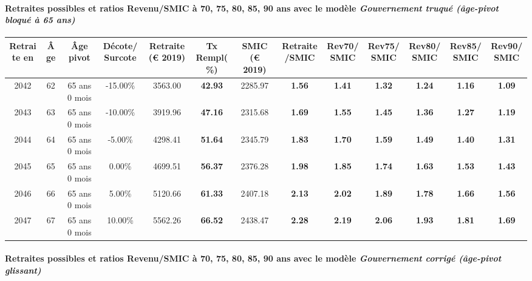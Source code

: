 \paragraph{Retraites possibles et ratios Revenu/SMIC à 70, 75, 80, 85, 90 ans avec le modèle \emph{Gouvernement truqué (âge-pivot bloqué à 65 ans)}}  
 
{ \scriptsize \begin{center} 
\begin{tabular}[htb]{|c|c||c|c||c|c||c||c|c|c|c|c|c|} 
\hline 
 Retraite en &  Âge &  Âge pivot &  Décote/Surcote &  Retraite (\euro{} 2019) &  Tx Rempl(\%) &  SMIC (\euro{} 2019) &  Retraite/SMIC &  Rev70/SMIC &  Rev75/SMIC &  Rev80/SMIC &  Rev85/SMIC &  Rev90/SMIC \\ 
\hline \hline 
 2042 &  62 &  65 ans 0 mois &  -15.00\% &  3563.00 &  {\bf 42.93} &  2285.97 &  {\bf 1.56} &  {\bf 1.41} &  {\bf 1.32} &  {\bf 1.24} &  {\bf 1.16} &  {\bf 1.09} \\ 
\hline 
 2043 &  63 &  65 ans 0 mois &  -10.00\% &  3919.96 &  {\bf 47.16} &  2315.68 &  {\bf 1.69} &  {\bf 1.55} &  {\bf 1.45} &  {\bf 1.36} &  {\bf 1.27} &  {\bf 1.19} \\ 
\hline 
 2044 &  64 &  65 ans 0 mois &  -5.00\% &  4298.41 &  {\bf 51.64} &  2345.79 &  {\bf 1.83} &  {\bf 1.70} &  {\bf 1.59} &  {\bf 1.49} &  {\bf 1.40} &  {\bf 1.31} \\ 
\hline 
 2045 &  65 &  65 ans 0 mois &  0.00\% &  4699.51 &  {\bf 56.37} &  2376.28 &  {\bf 1.98} &  {\bf 1.85} &  {\bf 1.74} &  {\bf 1.63} &  {\bf 1.53} &  {\bf 1.43} \\ 
\hline 
 2046 &  66 &  65 ans 0 mois &  5.00\% &  5120.66 &  {\bf 61.33} &  2407.18 &  {\bf 2.13} &  {\bf 2.02} &  {\bf 1.89} &  {\bf 1.78} &  {\bf 1.66} &  {\bf 1.56} \\ 
\hline 
 2047 &  67 &  65 ans 0 mois &  10.00\% &  5562.26 &  {\bf 66.52} &  2438.47 &  {\bf 2.28} &  {\bf 2.19} &  {\bf 2.06} &  {\bf 1.93} &  {\bf 1.81} &  {\bf 1.69} \\ 
\hline 
\hline 
\end{tabular} 
\end{center} } 
\paragraph{Retraites possibles et ratios Revenu/SMIC à 70, 75, 80, 85, 90 ans avec le modèle \emph{Gouvernement corrigé (âge-pivot glissant)}}  
 
